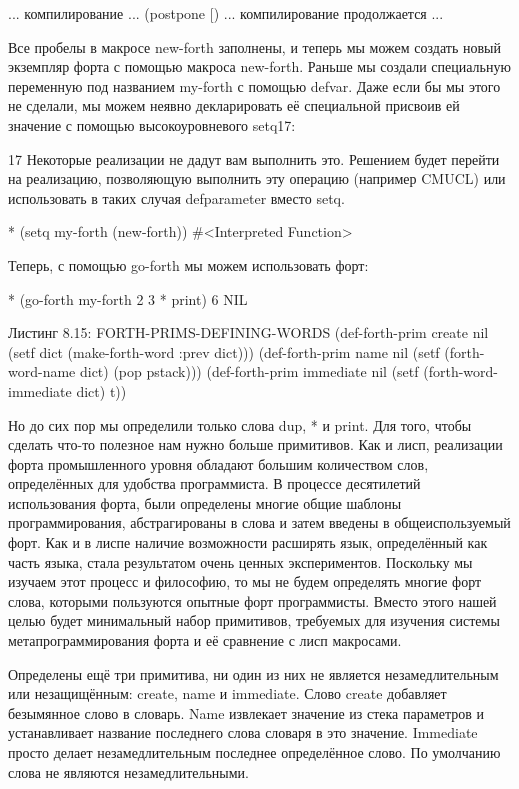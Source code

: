... компилирование ...
(postpone [)
... компилирование продолжается ...

Все пробелы в макросе new-forth заполнены, и теперь мы можем создать новый экземпляр форта с помощью макроса new-forth. Раньше мы создали специальную переменную под названием my-forth с помощью defvar. Даже если бы мы этого не сделали, мы можем неявно декларировать её специальной присвоив ей значение с помощью высокоуровневого setq17:

17 Некоторые реализации не дадут вам выполнить это. Решением будет перейти на реализацию, позволяющую выполнить эту операцию (например CMUCL) или использовать в таких случая defparameter вместо setq.

* (setq my-forth (new-forth))
#<Interpreted Function>

Теперь, с помощью go-forth мы можем использовать форт:

* (go-forth my-forth
2 3 * print)
6
NIL

Листинг 8.15: FORTH-PRIMS-DEFINING-WORDS
(def-forth-prim create nil
(setf dict (make-forth-word :prev dict)))
(def-forth-prim name nil
(setf (forth-word-name dict) (pop pstack)))
(def-forth-prim immediate nil
(setf (forth-word-immediate dict) t))

Но до сих пор мы определили только слова dup, * и print. Для того, чтобы сделать что-то полезное нам нужно больше примитивов. Как и лисп, реализации форта промышленного уровня обладают большим количеством слов, определённых для удобства программиста. В процессе десятилетий использования форта, были определены многие общие шаблоны программирования, абстрагированы в слова и затем введены в общеиспользуемый форт. Как и в лиспе наличие возможности расширять язык, определённый как часть языка, стала результатом очень ценных экспериментов. Поскольку мы изучаем этот процесс и философию, то мы не будем определять многие форт слова, которыми пользуются опытные форт программисты. Вместо этого нашей целью будет минимальный набор примитивов, требуемых для изучения системы метапрограммирования форта и её сравнение с лисп макросами.

Определены ещё три примитива, ни один из них не является незамедлительным или незащищённым: create, name и immediate. Слово create добавляет безымянное слово в словарь. Name извлекает значение из стека параметров и устанавливает название последнего слова словаря в это значение. Immediate просто делает незамедлительным последнее определённое слово. По умолчанию слова не являются незамедлительными.

